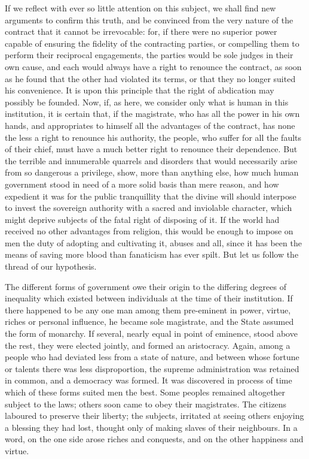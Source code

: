 \documentclass[12pt]{report}
\begin{document}
If we reflect with ever so little attention on this subject, we shall find new arguments to confirm this truth, and be convinced from the very nature of the contract that it cannot be irrevocable: for, if there were no superior power capable of ensuring the fidelity of the contracting parties, or compelling them to perform their reciprocal engagements, the parties would be sole judges in their own cause, and each would always have a right to renounce the contract, as soon as he found that the other had violated its terms, or that they no longer suited his convenience. It is upon this principle that the right of abdication may possibly be founded. Now, if, as here, we consider only what is human in this institution, it is certain that, if the magistrate, who has all the power in his own hands, and appropriates to himself all the advantages of the contract, has none the less a right to renounce his authority, the people, who suffer for all the faults of their chief, must have a much better right to renounce their dependence. But the terrible and innumerable quarrels and disorders that would necessarily arise from so dangerous a privilege, show, more than anything else, how much human government stood in need of a more solid basis than mere reason, and how expedient it was for the public tranquillity that the divine will should interpose to invest the sovereign authority with a sacred and inviolable character, which might deprive subjects of the fatal right of disposing of it. If the world had received no other advantages from religion, this would be enough to impose on men the duty of adopting and cultivating it, abuses and all, since it has been the means of saving more blood than fanaticism has ever spilt. But let us follow the thread of our hypothesis.

The different forms of government owe their origin to the differing degrees of inequality which existed between individuals at the time of their institution. If there happened to be any one man among them pre-eminent in power, virtue, riches or personal influence, he became sole magistrate, and the State assumed the form of monarchy. If several, nearly equal in point of eminence, stood above the rest, they were elected jointly, and formed an aristocracy. Again, among a people who had deviated less from a state of nature, and between whose fortune or talents there was less disproportion, the supreme administration was retained in common, and a democracy was formed. It was discovered in process of time which of these forms suited men the best. Some peoples remained altogether subject to the laws; others soon came to obey their magistrates. The citizens laboured to preserve their liberty; the subjects, irritated at seeing others enjoying a blessing they had lost, thought only of making slaves of their neighbours. In a word, on the one side arose riches and conquests, and on the other happiness and virtue.
\end{document}

